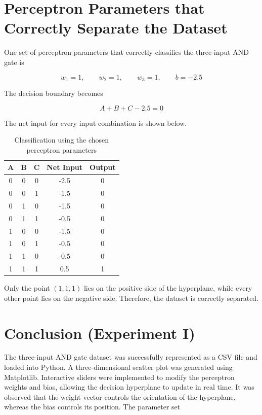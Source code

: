 \documentclass[12pt]{article}
\begin{document}
\section{Perceptron Parameters that Correctly Separate the Dataset}

One set of perceptron parameters that correctly classifies the three-input AND gate is

\[
    w_1=1,\qquad
    w_2=1,\qquad
    w_3=1,\qquad
    b=-2.5
\]

The decision boundary becomes

\[
    A+B+C-2.5=0
\]

The net input for every input combination is shown below.

\begin{table}[H]
    \centering
    \begin{tabular}{ccccc}
        \toprule
        A & B & C & Net Input & Output \\
        \midrule
        0 & 0 & 0 & -2.5      & 0      \\
        0 & 0 & 1 & -1.5      & 0      \\
        0 & 1 & 0 & -1.5      & 0      \\
        0 & 1 & 1 & -0.5      & 0      \\
        1 & 0 & 0 & -1.5      & 0      \\
        1 & 0 & 1 & -0.5      & 0      \\
        1 & 1 & 0 & -0.5      & 0      \\
        1 & 1 & 1 & 0.5       & 1      \\
        \bottomrule
    \end{tabular}
    \caption{Classification using the chosen perceptron parameters}
\end{table}

Only the point $(1,1,1)$ lies on the positive side of the hyperplane, while every other point lies on the negative side. Therefore, the dataset is correctly separated.

\section{Conclusion (Experiment I)}

The three-input AND gate dataset was successfully represented as a CSV file and loaded into Python. A three-dimensional scatter plot was generated using Matplotlib. Interactive sliders were implemented to modify the perceptron weights and bias, allowing the decision hyperplane to update in real time. It was observed that the weight vector controls the orientation of the hyperplane, whereas the bias controls its position. The parameter set
\end{document}
